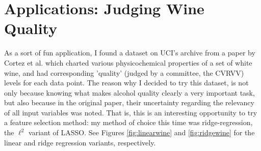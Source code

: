 \section{Applications: Judging Wine Quality}

As a sort of fun application, I found a dataset on UCI's archive from a paper by
Cortez et al. \cite{2009CCAMR} which charted various physicochemical properties
of a set of white wine, and had corresponding 'quality' (judged by a committee,
the CVRVV) levels for each data point. The reason why I decided to try this
dataset, is not only because knowing what makes alcohol quality clearly
a very important task, but also because in the original paper, their uncertainty
regarding the relevancy of all input variables was noted. That is, this is an
interesting opportunity to try a feature selection method: my method of choice
this time was ridge-regression, the $\ell^2$ variant of LASSO. See Figures
\ref{fig:linearwine} and \ref{fig:ridgewine} for the linear and ridge regression
variants, respectively.
